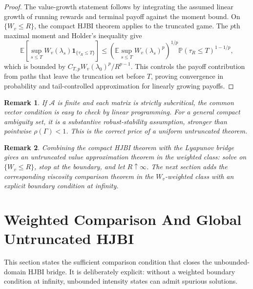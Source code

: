 \documentclass[11pt]{article}
\newtheorem{remark}{Remark}
\newcommand{\E}{\mathbb{E}}
\begin{document}
\begin{proof}
The value-growth statement follows by integrating the assumed linear growth of
running rewards and terminal payoff against the moment bound. On
$\{W_v\le R\}$, the compact HJBI theorem applies to the truncated game. The
$p$th maximal moment and Holder's inequality give
\[
\E\left[
\sup_{s\le T}W_v(\lambda_s)\mathbf 1_{\{\tau_R\le T\}}
\right]
\le
\left(\E\sup_{s\le T}W_v(\lambda_s)^p\right)^{1/p}
\mathbb P(\tau_R\le T)^{1-1/p},
\]
which is bounded by $C_{T,p}W_v(\lambda_0)^p/R^{p-1}$. This controls the payoff
contribution from paths that leave the truncation set before $T$, proving
convergence in probability and tail-controlled approximation for linearly
growing payoffs.
\end{proof}

\begin{remark}
If $\mathcal A$ is finite and each matrix is strictly subcritical, the common
vector condition is easy to check by linear programming. For a general compact
ambiguity set, it is a substantive robust-stability assumption, stronger than
pointwise $\rho(\Gamma)<1$. This is the correct price of a uniform
untruncated theorem.
\end{remark}

\begin{remark}
Combining the compact HJBI theorem with the Lyapunov bridge gives an
untruncated value approximation theorem in the weighted class: solve on
$\{W_v\le R\}$, stop at the boundary, and let $R\uparrow\infty$. The next
section adds the corresponding viscosity comparison theorem in the
$W_v$-weighted class with an explicit boundary condition at infinity.
\end{remark}

\section{Weighted Comparison And Global Untruncated HJBI}

This section states the sufficient comparison condition that closes the
unbounded-domain HJBI bridge. It is deliberately explicit: without a weighted
boundary condition at infinity, unbounded intensity states can admit spurious
solutions.
\end{document}
